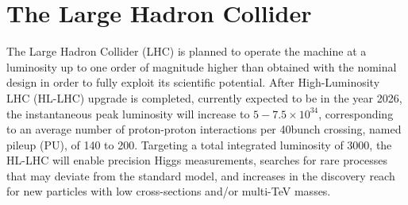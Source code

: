 \section{The Large Hadron Collider}\label{sec:lhc}

The Large Hadron Collider (LHC) \cite{LHCMachine} is planned to operate the machine at a luminosity up to one order of magnitude higher than obtained with the nominal design in order to fully exploit its scientific potential.  After High-Luminosity LHC (HL-LHC) upgrade \cite{hl-lhc-prelim-design-report} is completed, currently expected to be in the year 2026, the instantaneous peak luminosity will increase to $5-7.5 \times {10}^{34}$\percms, corresponding to an average number of proton-proton interactions per 40\MHz bunch crossing, named pileup (PU), of 140 to 200. Targeting a total integrated luminosity of $3000$\fbinv, the HL-LHC will enable precision Higgs measurements, searches for rare processes that may deviate from the standard model, and increases in the discovery reach for new particles with low cross-sections and/or multi-TeV masses.
